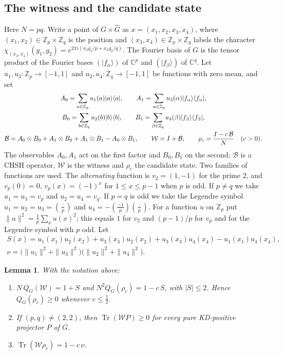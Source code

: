 \documentclass[11pt,a4paper]{article}
\newtheorem{lemma}[theorem]{Lemma}
\theoremstyle{definition}
\theoremstyle{plain}
\DeclareMathOperator{\Tr}{Tr}
\newcommand{\C}{\mathbb C}
\newcommand{\Z}{\mathbb Z}
\newcommand{\B}{\mathcal B}
\newcommand{\Wc}{\mathcal W}
\newcommand{\ket}[1]{\lvert#1\rangle}
\newcommand{\bra}[1]{\langle#1\rvert}
\newcommand{\leg}[2]{\left(\frac{#1}{#2}\right)}
\begin{document}
\subsection{The witness and the candidate state}
Here $N=pq$. Write a point of $G\times\widehat G$ as $x=(x_1,x_2,x_3,x_4)$,
where $(x_1,x_2)\in\Z_p\times\Z_q$ is the position and $(x_3,x_4)\in
\Z_p\times\Z_q$ labels the character
$\chi_{(x_3,x_4)}(g_1,g_2)=e^{2\pi i(x_3g_1/p+x_4g_2/q)}$. The Fourier basis
of $G$ is the tensor product of the Fourier bases $(\ket{f_\alpha})$ of
$\C^p$ and $(\ket{f_\beta})$ of $\C^q$. Let $u_1,u_3:\Z_p\to[-1,1]$ and
$u_2,u_4:\Z_q\to[-1,1]$ be functions with zero mean, and set
\begin{gather}
 A_0=\sum_{a\in\Z_p}u_1(a)\ket a\bra a,\qquad
 A_1=\sum_{\alpha\in\Z_p}u_3(\alpha)\ket{f_\alpha}\bra{f_\alpha},\notag\\
 B_0=\sum_{b\in\Z_q}u_2(b)\ket b\bra b,\qquad
 B_1=\sum_{\beta\in\Z_q}u_4(\beta)\ket{f_\beta}\bra{f_\beta},\notag\\
 \B=A_0\otimes B_0+A_1\otimes B_0+A_1\otimes B_1-A_0\otimes B_1,
 \qquad \Wc=I+\B,\qquad \rho_c=\frac{I-c\,\B}{N}\quad(c>0).
 \label{eq:chsh}
\end{gather}
The observables $A_0,A_1$ act on the first factor and $B_0,B_1$ on the
second; $\B$ is a CHSH operator, $\Wc$ is the witness and $\rho_c$ the
candidate state. Two families of functions are used. The \emph{alternating}
function is $v_2=(1,-1)$ for the prime $2$, and $v_p(0)=0$,
$v_p(x)=(-1)^x$ for $1\leq x\leq p-1$ when $p$ is odd. If $p\neq q$ we take
$u_1=u_3=v_p$ and $u_2=u_4=v_q$. If $p=q$ is odd we take the Legendre symbol
$u_1=u_2=u_3=\leg{\cdot}{p}$ and $u_4=-\leg{-1}{p}\leg{\cdot}{p}$. For a
function $u$ on $\Z_p$ put $\|u\|^2=\frac1p\sum_xu(x)^2$; this equals $1$ for
$v_2$ and $(p-1)/p$ for $v_p$ and for the Legendre symbol with $p$ odd. Let
\begin{equation}\label{eq:nu}
\begin{gathered}
 S(x)=u_1(x_1)u_2(x_2)+u_3(x_3)u_2(x_2)+u_3(x_3)u_4(x_4)-u_1(x_1)u_4(x_4),\\
 \nu=\bigl(\|u_1\|^2+\|u_3\|^2\bigr)\bigl(\|u_2\|^2+\|u_4\|^2\bigr).
\end{gathered}
\end{equation}

\begin{lemma}\label{lem:props}
With the notation above:
\begin{enumerate}
\item[(a)] $N\,Q_G(\Wc)=1+S$ and $N^2Q_G(\rho_c)=1-c\,S$, with $|S|\leq2$.
Hence $Q_G(\rho_c)\geq0$ whenever $c\leq\frac12$.
\item[(b)] If $(p,q)\neq(2,2)$, then $\Tr(\Wc P)\geq0$ for every pure
KD-positive projector $P$ of $G$.
\item[(c)] $\Tr(\Wc\rho_c)=1-c\,\nu$.
\end{enumerate}
\end{lemma}
\end{document}
